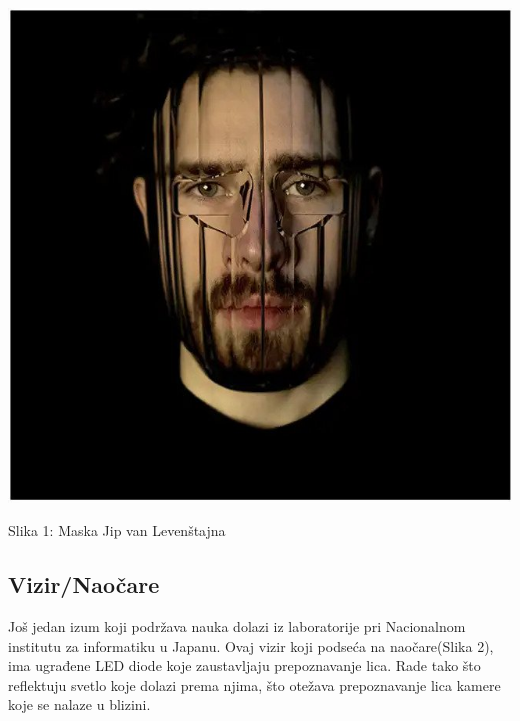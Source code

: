 \documentclass{article}
\begin{document}
\begin{center}
\begin{minipage}{0.5\textwidth}
\includegraphics[width=\textwidth]{slika.jpg}
\end{minipage}

\vspace{0.5cm}

Slika 1: Maska Jip van Levenštajna
\end{center}

\subsection{Vizir/Naočare}
Još jedan izum koji podržava nauka dolazi iz laboratorije pri Nacionalnom institutu za informatiku u Japanu. Ovaj vizir koji podseća na naočare(Slika 2), ima ugrađene LED diode koje zaustavljaju prepoznavanje lica. Rade tako što reflektuju svetlo koje dolazi prema njima, što otežava prepoznavanje lica kamere koje se nalaze u blizini.
\end{document}
